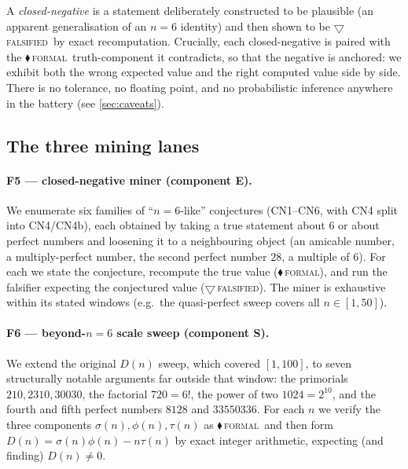 \documentclass[11pt,a4paper]{article}
\newcommand{\sig}{\sigma}
\newcommand{\Dn}{D(n)}
\newcommand{\tierF}{\textcolor{blue!60!black}{$\blacklozenge$}\,\textsc{formal}}
\newcommand{\tierR}{\textcolor{red!70!black}{$\bigtriangledown$}\,\textsc{falsified}}
\theoremstyle{definition}
\begin{document}
A \emph{closed-negative} is a statement deliberately constructed to be
plausible (an apparent generalisation of an $n=6$ identity) and then shown to be
\tierR\ by exact recomputation. Crucially, each closed-negative is paired with
the \tierF\ truth-component it contradicts, so that the negative is anchored: we
exhibit both the wrong expected value and the right computed value side by side.
There is no tolerance, no floating point, and no probabilistic inference
anywhere in the battery (see \textsection\ref{sec:caveats}).

\subsection{The three mining lanes}

\paragraph{F5 --- closed-negative miner (component E).}
We enumerate six families of ``$n=6$-like'' conjectures (CN1--CN6, with CN4
split into CN4/CN4b), each obtained by taking a true statement about $6$ or
about perfect numbers and loosening it to a neighbouring object (an amicable
number, a multiply-perfect number, the second perfect number $28$, a multiple
of $6$). For each we state the conjecture, recompute the true value (\tierF),
and run the falsifier expecting the conjectured value (\tierR). The miner is
exhaustive within its stated windows (e.g.\ the quasi-perfect sweep covers all
$n\in[1,50]$).

\paragraph{F6 --- beyond-$n=6$ scale sweep (component S).}
We extend the original $\Dn$ sweep, which covered $[1,100]$, to seven
structurally notable arguments far outside that window: the primorials
$210,2310,30030$, the factorial $720=6!$, the power of two $1024=2^{10}$, and
the fourth and fifth perfect numbers $8128$ and $33550336$. For each $n$ we
verify the three components $\sig(n),\phi(n),\tau(n)$ as \tierF\ and then form
$\Dn=\sig(n)\phi(n)-n\tau(n)$ by exact integer arithmetic, expecting (and
finding) $\Dn\neq0$.
\end{document}
